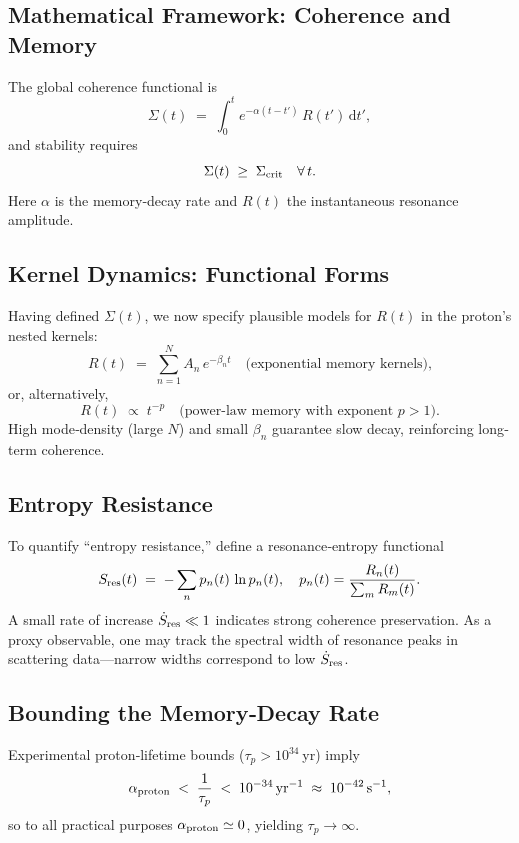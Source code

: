 \subsection{Mathematical Framework: Coherence and Memory}
The global coherence functional is
\begin{equation}\label{eq:coherence_integral}
\Sigma(t) \;=\; \int_{0}^{t} e^{-\alpha (t - t')}\,R(t')\,\mathrm{d}t',
\end{equation}
and stability requires
\begin{equation}\label{eq:coherence_threshold}
\Sigma(t)\;\ge\;\Sigma_{\rm crit}
\quad\forall\,t.
\end{equation}
Here \(\alpha\) is the memory‐decay rate and \(R(t)\) the instantaneous resonance amplitude.

\subsection{Kernel Dynamics: Functional Forms}
Having defined \(\Sigma(t)\), we now specify plausible models for \(R(t)\) in the proton’s nested kernels:
\[
R(t) \;=\; \sum_{n=1}^{N} A_n\,e^{-\beta_n t}
\quad\text{(exponential memory kernels),}
\]
or, alternatively,
\[
R(t) \;\propto\; t^{-p}
\quad\text{(power‐law memory with exponent \(p>1\)).}
\]
High mode‐density (large \(N\)) and small \(\beta_n\) guarantee slow decay, reinforcing long‐term coherence.

\subsection{Entropy Resistance}
To quantify “entropy resistance,” define a resonance‐entropy functional
\[
S_{\rm res}(t)
\;=\;
- \sum_{n} p_n(t)\,\ln p_n(t),
\quad
p_n(t) = \frac{R_n(t)}{\sum_m R_m(t)}.
\]
A small rate of increase \(\dot S_{\rm res}\ll1\) indicates strong coherence preservation.  As a proxy observable, one may track the spectral width of resonance peaks in scattering data—narrow widths correspond to low \(\dot S_{\rm res}\).

\subsection{Bounding the Memory‐Decay Rate}
Experimental proton‐lifetime bounds (\(\tau_p>10^{34}\) yr) imply
\[
\alpha_{\rm proton}
\;<\;\frac{1}{\tau_p}
\;<\;10^{-34}\,\mathrm{yr^{-1}}
\;\approx\;10^{-42}\,\mathrm{s^{-1}},
\]
so to all practical purposes \(\alpha_{\rm proton}\simeq0\), yielding \(\tau_p\to\infty\).

